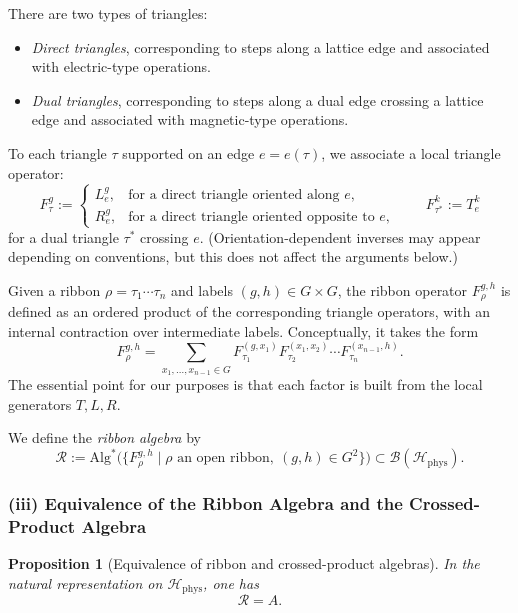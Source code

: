 \documentclass[12pt]{article}
\theoremstyle{definition} %
\theoremstyle{plain} %
\newtheorem{proposition}[theorem]{Proposition}
\theoremstyle{remark} %
\theoremstyle{underline}
\begin{document}
There are two types of triangles:
\begin{itemize}
    \item \emph{Direct triangles}, corresponding to steps along a lattice edge and associated with electric-type operations.
    \item \emph{Dual triangles}, corresponding to steps along a dual edge crossing a lattice edge and associated with magnetic-type operations.
\end{itemize}

To each triangle $\tau$ supported on an edge $e=e(\tau)$, we associate a local
triangle operator:
\[
    F_\tau^g :=
    \begin{cases}
    L_e^g, & \text{for a direct triangle oriented along } e,\\
    R_e^g, & \text{for a direct triangle oriented opposite to } e,
    \end{cases}
    \qquad
    F_{\tau^\ast}^k := T_e^k
\]
for a dual triangle $\tau^\ast$ crossing $e$.
(Orientation-dependent inverses may appear depending on conventions, but this does not affect the arguments below.)

Given a ribbon $\rho=\tau_1\cdots\tau_n$ and labels $(g,h)\in G\times G$, the ribbon operator $F_\rho^{g,h}$ is defined as an ordered product of the corresponding triangle operators, with an internal contraction over intermediate labels.
Conceptually, it takes the form
\[
    F_\rho^{g,h}
    =
    \sum_{x_1,\dots,x_{n-1}\in G}
    F_{\tau_1}^{(g,x_1)} F_{\tau_2}^{(x_1,x_2)} \cdots
    F_{\tau_n}^{(x_{n-1},h)}.
\]
The essential point for our purposes is that each factor is built from the local generators $T,L,R$.

We define the \emph{ribbon algebra} by
\[
    \mathcal R :=
    \mathrm{Alg}^\ast\bigl(\{F_\rho^{g,h} \mid \rho \text{ an open ribbon},\ (g,h)\in G^2\}\bigr)
    \subset \mathcal B(\mathcal H_{\mathrm{phys}}).
\]

\subsubsection*{(iii) Equivalence of the Ribbon Algebra and the Crossed-Product Algebra}

\begin{proposition}[Equivalence of ribbon and crossed-product algebras]
In the natural representation on $\mathcal H_{\mathrm{phys}}$, one has
\[
    \mathcal R = A.
\]
\end{proposition}
\end{document}
